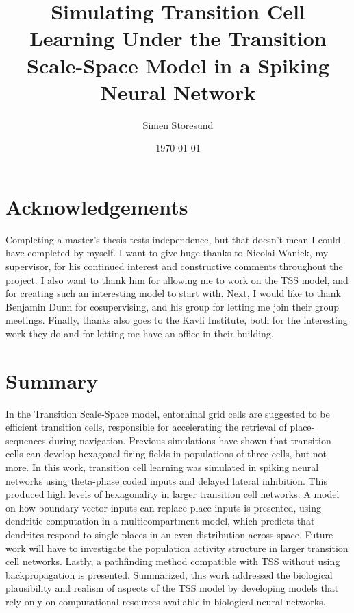 \documentclass{article}
\title{Simulating Transition Cell Learning Under the Transition Scale-Space Model in a Spiking Neural Network}
\author{Simen Storesund}
\date{\today}
\begin{document}
    \section*{Acknowledgements}
    Completing a master's thesis tests independence, but that doesn't mean I could have completed by myself. I want to give huge thanks to Nicolai Waniek, my supervisor, for his continued interest and constructive comments throughout the project. I also want to thank him for allowing me to work on the TSS model, and for creating such an interesting model to start with. Next, I would like to thank Benjamin Dunn for cosupervising, and his group for letting me join their group meetings. Finally, thanks also goes to the Kavli Institute, both for the interesting work they do and for letting me have an office in their building.

    \newpage
    \tableofcontents

    \newpage
    \section*{Summary}
    In the Transition Scale-Space model, entorhinal grid cells are suggested to be efficient transition cells, responsible for accelerating the retrieval of place-sequences during navigation. Previous simulations have shown that transition cells can develop hexagonal firing fields in populations of three cells, but not more. In this work, transition cell learning was simulated in spiking neural networks using theta-phase coded inputs and delayed lateral inhibition. This produced high levels of hexagonality in larger transition cell networks. A model on how boundary vector inputs can replace place inputs is presented, using dendritic computation in a multicompartment model, which predicts that dendrites respond to single places in an even distribution across space. Future work will have to investigate the population activity structure in larger transition cell networks. Lastly, a pathfinding method compatible with TSS without  using backpropagation is presented. Summarized, this work addressed the biological plausibility and realism of aspects of the TSS model by developing models that rely only on computational resources available in biological neural networks.

    \newpage
\end{document}
